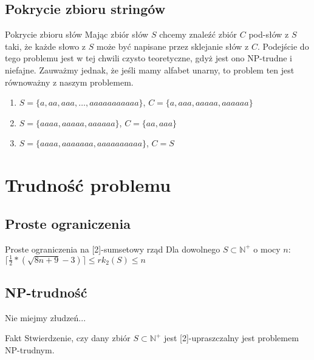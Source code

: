 \documentclass{beamer}
\newcommand{\N}{\mathbb{N}}
\begin{document}
	\subsection{Pokrycie zbioru stringów}
		\begin{frame}
			\begin{block}{Pokrycie zbioru słów}
                Mając zbiór słów $ S $ chcemy znaleźć zbiór $ C $ pod-słów z $ S $ taki, że każde słowo z $ S $ może być napisane przez sklejanie słów z $ C $.
                Podejście do tego problemu jest w tej chwili czysto teoretyczne, gdyż jest ono NP-trudne i niefajne.
                Zauważmy jednak, że jeśli mamy alfabet unarny, to problem ten jest równoważny z naszym problemem.
                \begin{enumerate}
				    \pause \item $ S = \lbrace a,aa,aaa,\dots,aaaaaaaaaaa \rbrace $, $ C = \lbrace a,aaa,aaaaa,aaaaaa \rbrace $
				    \pause \item $ S = \lbrace aaaa,aaaaa,aaaaaa \rbrace $, $ C = \lbrace aa,aaa \rbrace $
				    \pause \item $ S = \lbrace aaaa,aaaaaaa,aaaaaaaaaa \rbrace $, $ C = S $
                \end{enumerate}
			\end{block}
		\end{frame}
		
\section{Trudność problemu}
	\subsection{Proste ograniczenia}
		\begin{frame}
            \begin{block}{Proste ograniczenia na [2]-sumsetowy rząd}
			    Dla dowolnego $ S \subset \N^{+} $ o mocy $ n $:
                $ \lceil \frac{1}{2} * ( \sqrt{8n + 9} - 3 ) \rceil \leq rk_2(S) \leq n $
            \end{block}
		\end{frame}
		
	\subsection{NP-trudność}
		\begin{frame}{Nie miejmy złudzeń...}
			\begin{exampleblock}{Fakt}
				Stwierdzenie, czy dany zbiór $ S \subset \N^{+} $ jest [2]-upraszczalny jest problemem NP-trudnym.
			\end{exampleblock}
				
		\end{frame}
		
\end{document}
